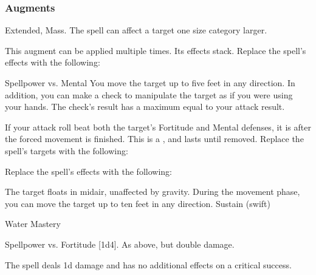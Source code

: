 \subsubsection{Augments}
 Extended, Mass.
The spell can affect a target one size category larger.
\par
This augment can be applied multiple times.
Its effects stack.
Replace
the spell's effects with the following:
\begin{augmenteffects}
\begin{spellattack}{Spellpower vs. Mental}
\spellsuccess
You move the target up to five feet in any direction.
In addition, you can make a check to manipulate the target as if you were using your hands.
The check's result has a maximum equal to your attack result.
\end{spellattack}
\end{augmenteffects}
If your attack roll beat both the target's Fortitude and Mental defenses, it is \immobilized after the forced movement is finished.
This is a , and lasts until removed.
Replace
the spell's targets with the following:
\begin{augmenttargetinginfo}
\end{augmenttargetinginfo}
Replace
the spell's effects with the following:
\begin{augmenteffects}
\spelleffect
The target floats in midair, unaffected by gravity.
During the movement phase, you can move the target up to ten feet in any direction.
\spelldur Sustain (swift)
\end{augmenteffects}
\begin{spellsection}{Water Mastery}
\begin{spellheader}
\end{spellheader}
\begin{spellcontent}
\begin{spelltargetinginfo}
\end{spelltargetinginfo}
\begin{spelleffects}
\begin{spellattack}{Spellpower vs. Fortitude}
\spellsuccess {}[1d4].
\spellcritical As above, but double damage.
\end{spellattack}
\end{spelleffects}
\end{spellcontent}
\begin{spellfooter}
\miscastexplode
\end{spellfooter}
\begin{spellcantrip}
The spell deals \minus1d damage and has no additional effects on a critical success.
\end{spellcantrip}
\end{spellsection}
